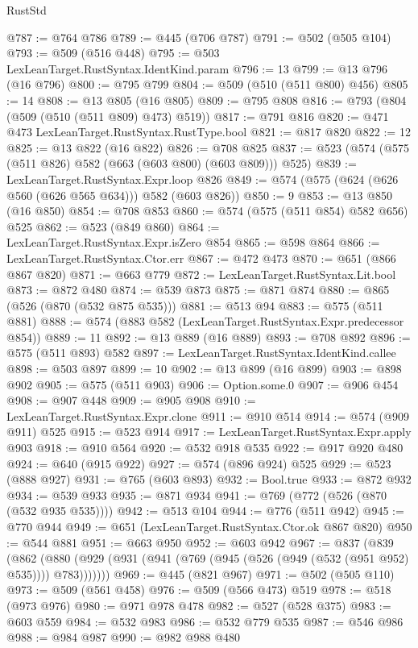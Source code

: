 \begin{lexlean}{RustStd}
\begin{coremodule}
@787 := @764 @786
@789 := @445 (@706 @787)
@791 := @502 (@505 @104)
@793 := @509 (@516 @448)
@795 := @503 LexLeanTarget.RustSyntax.IdentKind.param
@796 := 13
@799 := @13 @796 (@16 @796)
@800 := @795 @799
@804 := @509 (@510 (@511 @800) @456)
@805 := 14
@808 := @13 @805 (@16 @805)
@809 := @795 @808
@816 := @793 (@804 (@509 (@510 (@511 @809) @473) @519))
@817 := @791 @816
@820 := @471 @473 LexLeanTarget.RustSyntax.RustType.bool
@821 := @817 @820
@822 := 12
@825 := @13 @822 (@16 @822)
@826 := @708 @825
@837 := @523 (@574 (@575 (@511 @826) @582 (@663 (@603 @800) (@603 @809))) @525)
@839 := LexLeanTarget.RustSyntax.Expr.loop @826
@849 := @574 (@575 (@624 (@626 @560 (@626 @565 @634))) @582 (@603 @826))
@850 := 9
@853 := @13 @850 (@16 @850)
@854 := @708 @853
@860 := @574 (@575 (@511 @854) @582 @656) @525
@862 := @523 (@849 @860)
@864 := LexLeanTarget.RustSyntax.Expr.isZero @854
@865 := @598 @864
@866 := LexLeanTarget.RustSyntax.Ctor.err
@867 := @472 @473
@870 := @651 (@866 @867 @820)
@871 := @663 @779
@872 := LexLeanTarget.RustSyntax.Lit.bool
@873 := @872 @480
@874 := @539 @873
@875 := @871 @874
@880 := @865 (@526 (@870 (@532 @875 @535)))
@881 := @513 @94
@883 := @575 (@511 @881)
@888 := @574 (@883 @582 (LexLeanTarget.RustSyntax.Expr.predecessor @854))
@889 := 11
@892 := @13 @889 (@16 @889)
@893 := @708 @892
@896 := @575 (@511 @893) @582
@897 := LexLeanTarget.RustSyntax.IdentKind.callee
@898 := @503 @897
@899 := 10
@902 := @13 @899 (@16 @899)
@903 := @898 @902
@905 := @575 (@511 @903)
@906 := Option.some.{0}
@907 := @906 @454
@908 := @907 @448
@909 := @905 @908
@910 := LexLeanTarget.RustSyntax.Expr.clone
@911 := @910 @514
@914 := @574 (@909 @911) @525
@915 := @523 @914
@917 := LexLeanTarget.RustSyntax.Expr.apply @903
@918 := @910 @564
@920 := @532 @918 @535
@922 := @917 @920 @480
@924 := @640 (@915 @922)
@927 := @574 (@896 @924) @525
@929 := @523 (@888 @927)
@931 := @765 (@603 @893)
@932 := Bool.true
@933 := @872 @932
@934 := @539 @933
@935 := @871 @934
@941 := @769 (@772 (@526 (@870 (@532 @935 @535))))
@942 := @513 @104
@944 := @776 (@511 @942)
@945 := @770 @944
@949 := @651 (LexLeanTarget.RustSyntax.Ctor.ok @867 @820)
@950 := @544 @881
@951 := @663 @950
@952 := @603 @942
@967 := @837
    (@839
      (@862 (@880 (@929 (@931 (@941 (@769 (@945 (@526 (@949 (@532 (@951 @952) @535)))) @783)))))))
@969 := @445 (@821 @967)
@971 := @502 (@505 @110)
@973 := @509 (@561 @458)
@976 := @509 (@566 @473) @519
@978 := @518 (@973 @976)
@980 := @971 @978 @478
@982 := @527 (@528 @375)
@983 := @603 @559
@984 := @532 @983
@986 := @532 @779 @535
@987 := @546 @986
@988 := @984 @987
@990 := @982 @988 @480

\end{coremodule}
\end{lexlean}
